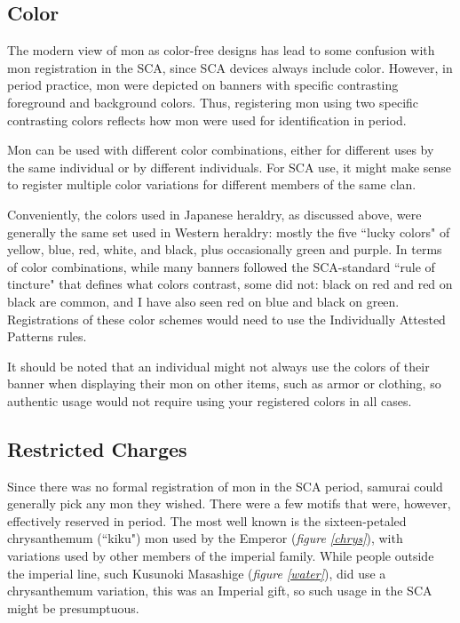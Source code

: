 \documentclass{article}
\newcounter{fig}
\begin{document}
\subsection{Color}

  The modern view of mon as color-free designs has lead to some
  confusion with mon registration in the SCA, since SCA devices always
  include color.  However, in period practice, mon were depicted on
  banners with specific contrasting foreground and background colors.
  Thus, registering mon using two specific contrasting colors reflects
  how mon were used for identification in period.

  Mon can be used with different color combinations, either for
  different uses by the same individual or by different individuals.
  For SCA use, it might make sense to register multiple color
  variations for different members of the same clan.

  Conveniently, the colors used in Japanese heraldry, as discussed
  above, were generally the same set used in Western heraldry: mostly
  the five ``lucky colors" of yellow, blue, red, white, and black, plus
  occasionally green and purple.  In terms of color combinations,
  while many banners followed the SCA-standard ``rule of tincture" that
  defines what colors contrast, some did not: black on red and red on
  black are common, and I have also seen red on
  blue and black on green.
  Registrations of these color schemes would need to use the
  Individually Attested Patterns rules.

  It should be noted that an individual might not always use the
  colors of their banner when displaying their mon on other items,
  such as armor or clothing, so authentic usage would not require
  using your registered colors in all cases.

\subsection{Restricted Charges}

  Since there was no formal registration of mon in the SCA period,
  samurai could generally pick any mon they wished.  There were a few motifs
  that were, however, effectively reserved in period.  The most well
  known is the sixteen-petaled chrysanthemum (``kiku") mon used
  by the Emperor (\emph{figure \ref{chrys}}), with variations used by other members of the
  imperial family. While people
  outside the imperial line, such Kusunoki Masashige (\emph{figure \ref{water}}), did use a
  chrysanthemum variation, this was an Imperial gift,
  so such usage in the SCA might be presumptuous.
\end{document}
